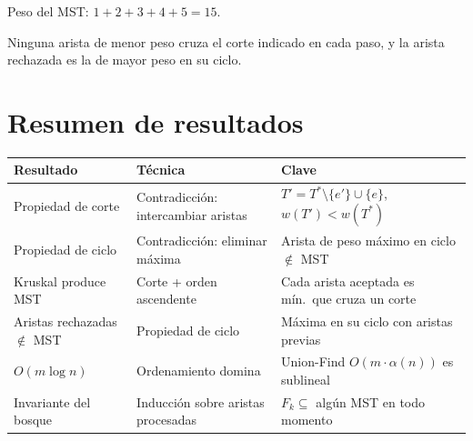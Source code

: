 \documentclass[11pt, letterpaper]{article}
\theoremstyle{definition}
\theoremstyle{plain}
\theoremstyle{remark}
\begin{document}
Peso del MST: $1 + 2 + 3 + 4 + 5 = 15$. \checkmark

Ninguna arista de menor peso cruza el corte indicado en cada paso,
y la arista rechazada es la de mayor peso en su ciclo. \checkmark

\section{Resumen de resultados}

\begin{table}[h]
\centering
\begin{tabular}{llp{5.5cm}}
\toprule
\textbf{Resultado} & \textbf{Técnica} & \textbf{Clave} \\
\midrule
Propiedad de corte
  & Contradicción: intercambiar aristas
  & $T' = T^* \setminus \{e'\} \cup \{e\}$, $w(T') < w(T^*)$ \\
Propiedad de ciclo
  & Contradicción: eliminar máxima
  & Arista de peso máximo en ciclo $\notin$ MST \\
Kruskal produce MST
  & Corte + orden ascendente
  & Cada arista aceptada es mín.\ que cruza un corte \\
Aristas rechazadas $\notin$ MST
  & Propiedad de ciclo
  & Máxima en su ciclo con aristas previas \\
$O(m \log n)$
  & Ordenamiento domina
  & Union-Find $O(m \cdot \alpha(n))$ es sublineal \\
Invariante del bosque
  & Inducción sobre aristas procesadas
  & $F_k \subseteq$ algún MST en todo momento \\
\bottomrule
\end{tabular}
\end{table}
\end{document}
